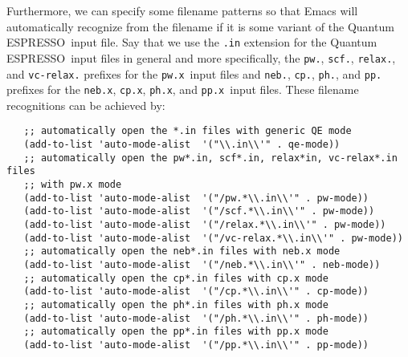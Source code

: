 \documentclass[12pt,a4paper]{article}
\def\qe{{\sc Quantum ESPRESSO}}
\def\pwx{\texttt{pw.x}}
\def\cpx{\texttt{cp.x}}
\def\phx{\texttt{ph.x}}
\def\ppx{\texttt{pp.x}}
\def\nebx{\texttt{neb.x}}
\begin{document}
Furthermore, we can specify some filename patterns so that Emacs will
automatically recognize from the filename if it is some variant of the
\qe\ input file.
%
Say that we use the \verb+.in+ extension for the \qe\ input files in
general and more specifically, the \texttt{pw.}, \texttt{scf.},
\texttt{relax.}, and \texttt{vc-relax.} prefixes for the \pwx\ input files
and \texttt{neb.}, \texttt{cp.}, \texttt{ph.},  and \texttt{pp.} prefixes for the
\nebx, \cpx, \phx, and \ppx\ input files. These filename recognitions can be
achieved by:
\begin{flushleft}
{\color{red}
\verb+   ;; automatically open the *.in files with generic QE mode+}\\
\verb+   (add-to-list 'auto-mode-alist  '("\\.in\\'" . qe-mode))+\\[1em]
{\color{red}
\verb+   ;; automatically open the pw*.in, scf*.in, relax*in, vc-relax*.in files+\\
\verb+   ;; with pw.x mode+}\\
\verb+   (add-to-list 'auto-mode-alist  '("/pw.*\\.in\\'" . pw-mode))+\\
\verb+   (add-to-list 'auto-mode-alist  '("/scf.*\\.in\\'" . pw-mode))+\\
\verb+   (add-to-list 'auto-mode-alist  '("/relax.*\\.in\\'" . pw-mode))+\\
\verb+   (add-to-list 'auto-mode-alist  '("/vc-relax.*\\.in\\'" . pw-mode))+\\[1em]
{\color{red}
\verb+   ;; automatically open the neb*.in files with neb.x mode+}\\
\verb+   (add-to-list 'auto-mode-alist  '("/neb.*\\.in\\'" . neb-mode))+\\[1em]
{\color{red}
\verb+   ;; automatically open the cp*.in files with cp.x mode+}\\
\verb+   (add-to-list 'auto-mode-alist  '("/cp.*\\.in\\'" . cp-mode))+\\[1em]
{\color{red}
\verb+   ;; automatically open the ph*.in files with ph.x mode+}\\
\verb+   (add-to-list 'auto-mode-alist  '("/ph.*\\.in\\'" . ph-mode))+\\[1em]
{\color{red}
\verb+   ;; automatically open the pp*.in files with pp.x mode+}\\
\verb+   (add-to-list 'auto-mode-alist  '("/pp.*\\.in\\'" . pp-mode))+\\[1em]
\end{flushleft}
\end{document}
